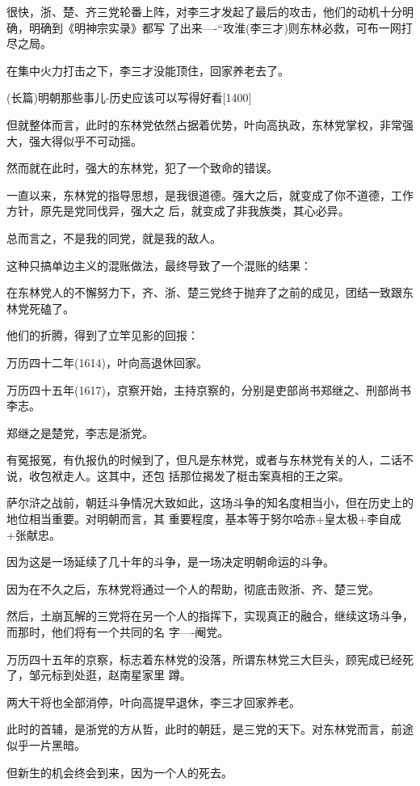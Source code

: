 \documentclass[11pt,a4paper,onecolumn]{article}
\begin{document}
很快，浙、楚、齐三党轮番上阵，对李三才发起了最后的攻击，他们的动机十分明确，明确到《明神宗实录》都写
了出来----``攻淮(李三才)则东林必救，可布一网打尽之局。

在集中火力打击之下，李三才没能顶住，回家养老去了。

(长篇)明朝那些事儿-历史应该可以写得好看$[$1400$]$

但就整体而言，此时的东林党依然占据着优势，叶向高执政，东林党掌权，非常强大，强大得似乎不可动摇。

然而就在此时，强大的东林党，犯了一个致命的错误。

一直以来，东林党的指导思想，是我很道德。强大之后，就变成了你不道德，工作方针，原先是党同伐异，强大之
后，就变成了非我族类，其心必异。

总而言之，不是我的同党，就是我的敌人。

这种只搞单边主义的混账做法，最终导致了一个混账的结果：

在东林党人的不懈努力下，齐、浙、楚三党终于抛弃了之前的成见，团结一致跟东林党死磕了。

他们的折腾，得到了立竿见影的回报：

万历四十二年(1614)，叶向高退休回家。

万历四十五年(1617)，京察开始，主持京察的，分别是吏部尚书郑继之、刑部尚书李志。

郑继之是楚党，李志是浙党。

有冤报冤，有仇报仇的时候到了，但凡是东林党，或者与东林党有关的人，二话不说，收包袱走人。这其中，还包
括那位揭发了梃击案真相的王之寀。

萨尔浒之战前，朝廷斗争情况大致如此，这场斗争的知名度相当小，但在历史上的地位相当重要。对明朝而言，其
重要程度，基本等于努尔哈赤+皇太极+李自成+张献忠。

因为这是一场延续了几十年的斗争，是一场决定明朝命运的斗争。

因为在不久之后，东林党将通过一个人的帮助，彻底击败浙、齐、楚三党。

然后，土崩瓦解的三党将在另一个人的指挥下，实现真正的融合，继续这场斗争，而那时，他们将有一个共同的名
字----阉党。

万历四十五年的京察，标志着东林党的没落，所谓东林党三大巨头，顾宪成已经死了，邹元标到处逛，赵南星家里
蹲。

两大干将也全部消停，叶向高提早退休，李三才回家养老。

此时的首辅，是浙党的方从哲，此时的朝廷，是三党的天下。对东林党而言，前途似乎一片黑暗。

但新生的机会终会到来，因为一个人的死去。
\end{document}
